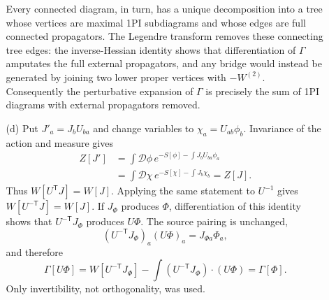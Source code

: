 \begin{enumerate}
\begin{enumerate}
    Every connected diagram, in turn, has a unique decomposition into a
    tree whose vertices are maximal 1PI subdiagrams and whose edges are full
    connected propagators.  The Legendre transform removes these connecting
    tree edges: the inverse-Hessian identity shows that differentiation of
    \(\Gamma\) amputates the full external propagators, and any bridge would
    instead be generated by joining two lower proper vertices with
    \(-W^{(2)}\).  Consequently the perturbative expansion of \(\Gamma\) is
    precisely the sum of 1PI diagrams with external propagators removed.
    \item[(d)]
    Put \(J'_a=J_bU_{ba}\) and change variables to
    \(\chi_a=U_{ab}\phi_b\).  Invariance of the action and measure gives
    \[
      \begin{split}
      Z[J']
        &=\int\mathcal D\phi\,
          e^{-S[\phi]-\int J_bU_{ba}\phi_a}\\
        &=\int\mathcal D\chi\,
          e^{-S[\chi]-\int J_b\chi_b}=Z[J].
      \end{split}
    \]
    Thus \(W[U^{\mathsf T}J]=W[J]\).  Applying the same statement to
    \(U^{-1}\) gives \(W[U^{-\mathsf T}J]=W[J]\).  If \(J_\Phi\) produces
    \(\Phi\), differentiation of this identity shows that
    \(U^{-\mathsf T}J_\Phi\) produces \(U\Phi\).  The source pairing is
    unchanged,
    \[
      (U^{-\mathsf T}J_\Phi)_a(U\Phi)_a=J_{\Phi a}\Phi_a,
    \]
    and therefore
    \[
      \Gamma[U\Phi]
        =W[U^{-\mathsf T}J_\Phi]
          -\int (U^{-\mathsf T}J_\Phi)\cdot(U\Phi)
        =\Gamma[\Phi].
    \]
    Only invertibility, not orthogonality, was used.
  \end{enumerate}


\end{enumerate}
